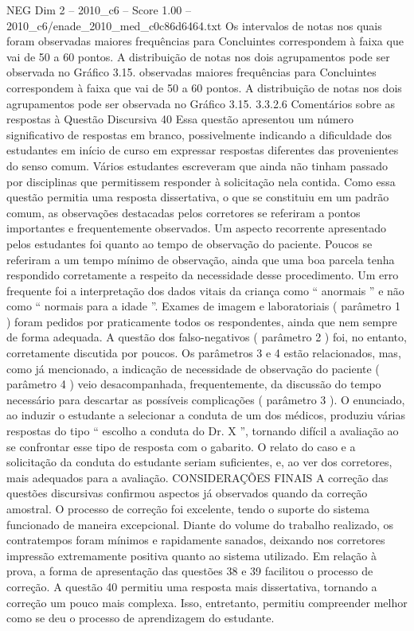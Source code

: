 \begin{textsample}{NEG Dim 2 – 2010\_c6 – Score 1.00 – 2010\_c6/enade\_2010\_med\_c0c86d6464.txt}
Os intervalos de notas nos quais foram observadas maiores frequências para Concluintes correspondem à faixa que vai de 50 a 60 pontos.
A distribuição de notas nos dois agrupamentos pode ser observada no Gráfico 3.15. observadas maiores frequências para Concluintes correspondem à faixa que vai de 50 a 60 pontos.
A distribuição de notas nos dois agrupamentos pode ser observada no Gráfico 3.15. 3.3.2.6 Comentários sobre as respostas à Questão Discursiva 40 Essa questão apresentou um número significativo de respostas em branco, possivelmente indicando a dificuldade dos estudantes em início de curso em expressar respostas diferentes das provenientes do senso comum.
Vários estudantes escreveram que ainda não tinham passado por disciplinas que permitissem responder à solicitação nela contida.
Como essa questão permitia uma resposta dissertativa, o que se constituiu em um padrão comum, as observações destacadas pelos corretores se referiram a pontos importantes e frequentemente observados.
Um aspecto recorrente apresentado pelos estudantes foi quanto ao tempo de observação do paciente.
Poucos se referiram a um tempo mínimo de observação, ainda que uma boa parcela tenha respondido corretamente a respeito da necessidade desse procedimento.
Um erro frequente foi a interpretação dos dados vitais da criança como “ anormais ” e não como “ normais para a idade ”.
Exames de imagem e laboratoriais ( parâmetro 1 ) foram pedidos por praticamente todos os respondentes, ainda que nem sempre de forma adequada.
A questão dos falso-negativos ( parâmetro 2 ) foi, no entanto, corretamente discutida por poucos.
Os parâmetros 3 e 4 estão relacionados, mas, como já mencionado, a indicação de necessidade de observação do paciente ( parâmetro 4 ) veio desacompanhada, frequentemente, da discussão do tempo necessário para descartar as possíveis complicações ( parâmetro 3 ).
O enunciado, ao induzir o estudante a selecionar a conduta de um dos médicos, produziu várias respostas do tipo “ escolho a conduta do Dr.
X ”, tornando difícil a avaliação ao se confrontar esse tipo de resposta com o gabarito.
O relato do caso e a solicitação da conduta do estudante seriam suficientes, e, ao ver dos corretores, mais adequados para a avaliação.
CONSIDERAÇÕES FINAIS A correção das questões discursivas confirmou aspectos já observados quando da correção amostral.
O processo de correção foi excelente, tendo o suporte do sistema funcionado de maneira excepcional.
Diante do volume do trabalho realizado, os contratempos foram mínimos e rapidamente sanados, deixando nos corretores impressão extremamente positiva quanto ao sistema utilizado.
Em relação à prova, a forma de apresentação das questões 38 e 39 facilitou o processo de correção.
A questão 40 permitiu uma resposta mais dissertativa, tornando a correção um pouco mais complexa.
Isso, entretanto, permitiu compreender melhor como se deu o processo de aprendizagem do estudante.

\end{textsample}

